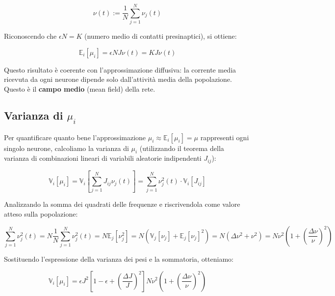 \begin{equation}
\nu(t) := \frac{1}{N} \sum_{j=1}^{N} \nu_j(t)
\end{equation}

Riconoscendo che $\epsilon N = K$ (numero medio di contatti presinaptici), si ottiene:

\begin{equation}
\mathbb{E}_i[\mu_i] = \epsilon N J \nu(t) = K J \nu(t)
\end{equation}

Questo risultato è coerente con l'approssimazione diffusiva: la corrente media ricevuta da ogni neurone dipende solo dall'attività media della popolazione. Questo è il \textbf{campo medio} (mean field) della rete.

\subsection{Varianza di $\mu_i$}

Per quantificare quanto bene l'approssimazione $\mu_i \approx \mathbb{E}_i[\mu_i] = \mu$ rappresenti ogni singolo neurone, calcoliamo la varianza di $\mu_i$ (utilizzando il teorema della varianza di combinazioni lineari di variabili aleatorie indipendenti $J_{ij}$):

\begin{equation}
\mathbb{V}_i[\mu_i] = \mathbb{V}_i\left[ \sum_{j=1}^{N} J_{ij} \nu_j(t) \right] = \sum_{j=1}^{N} \nu_j^2(t) \cdot \mathbb{V}_i[J_{ij}]
\end{equation}

Analizzando la somma dei quadrati delle frequenze e riscrivendola come valore atteso sulla popolazione:

\begin{equation}
\sum_{j=1}^{N} \nu_j^2(t) = N \frac{1}{N} \sum_{j=1}^{N} \nu_j^2(t) = N \mathbb{E}_j[\nu_j^2] = N \left( \mathbb{V}_j[\nu_j] + \mathbb{E}_j[\nu_j]^2 \right) = N(\Delta \nu^2 + \nu^2) = N \nu^2 \left( 1 + \left(\frac{\Delta \nu}{\nu}\right)^2 \right)
\end{equation}

Sostituendo l'espressione della varianza dei pesi e la sommatoria, otteniamo:

\begin{equation}
\mathbb{V}_i[\mu_i] = \epsilon J^2 \left[ 1 - \epsilon + \left(\frac{\Delta J}{J}\right)^2 \right] N \nu^2 \left( 1 + \left(\frac{\Delta \nu}{\nu}\right)^2 \right)
\end{equation}

